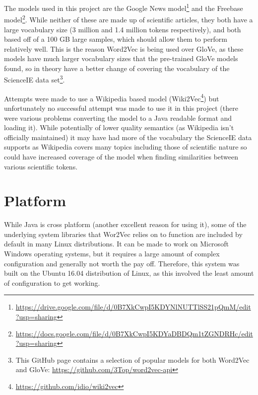 The models used in this project are the Google News model\footnote{\href{https://drive.google.com/file/d/0B7XkCwpI5KDYNlNUTTlSS21pQmM/edit?usp=sharing}{https://drive.google.com/file/d/0B7XkCwpI5KDYNlNUTTlSS21pQmM/edit?usp=sharing}} and the Freebase model\footnote{\href{https://docs.google.com/file/d/0B7XkCwpI5KDYaDBDQm1tZGNDRHc/edit?usp=sharing}{https://docs.google.com/file/d/0B7XkCwpI5KDYaDBDQm1tZGNDRHc/edit?usp=sharing}}. While neither of these are made up of scientific articles, they both have a large vocabulary size (3 million and 1.4 million tokens respectively), and both based off of a 100 GB large samples, which should allow them to perform relatively well. This is the reason Word2Vec is being used over GloVe, as these models have much larger vocabulary sizes that the pre-trained GloVe models found, so in theory have a better change of covering the vocabulary of the ScienceIE data set\footnote{This GitHub page contains a selection of popular models for both Word2Vec and GloVe: \href{https://github.com/3Top/word2vec-api}{https://github.com/3Top/word2vec-api}}.

Attempts were made to use a Wikipedia based model (Wiki2Vec\footnote{\href{https://github.com/idio/wiki2vec}{https://github.com/idio/wiki2vec}}) but unfortunately no successful attempt was made to use it in this project (there were various problems converting the model to a Java readable format and loading it). While potentially of lower quality semantics (as Wikipedia isn't officially maintained) it may have had more of the vocabulary the ScienceIE data supports as Wikipedia covers many topics including those of scientific nature so could have increased coverage of the model when finding similarities between various scientific tokens. 

\section{Platform}
While Java is cross platform (another excellent reason for using it), some of the underlying system libraries that Wor2Vec relies on to function are included by default in many Linux distributions. It can be made to work on Microsoft Windows operating systems, but it requires a large amount of complex configuration and generally not worth the pay off. Therefore, this system was built on the Ubuntu 16.04 distribution of Linux, as this involved the least amount of configuration to get working.

